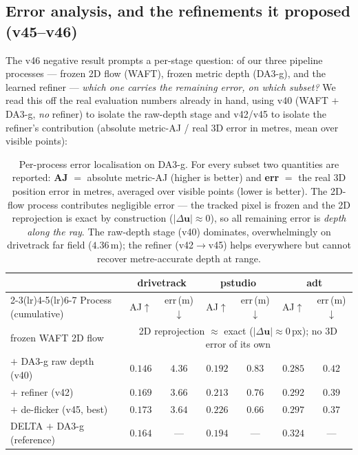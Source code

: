 \documentclass[11pt,a4paper]{article}
\begin{document}
\subsection{Error analysis, and the refinements it proposed (v45--v46)}
\label{sec:error-analysis}
The v46 negative result prompts a per-stage question: of our three pipeline processes --- frozen 2D flow
(WAFT), frozen metric depth (DA3-g), and the learned refiner --- \emph{which one carries the remaining
error, on which subset?} We read this off the real evaluation numbers already in hand, using v40 (WAFT $+$
DA3-g, \emph{no} refiner) to isolate the raw-depth stage and v42/v45 to isolate the refiner's contribution
(absolute metric-AJ / real 3D error in metres, mean over visible points):

\begin{table}[h]
\centering
\small
\caption{Per-process error localisation on DA3-g. For every subset two quantities are reported:
\textbf{AJ} $=$ absolute metric-AJ (higher is better) and \textbf{err} $=$ the real 3D position error in
metres, averaged over visible points (lower is better). The 2D-flow process contributes negligible error ---
the tracked pixel is frozen and the 2D reprojection is exact by construction ($|\Delta\mathbf{u}|\!\approx\!0$),
so all remaining error is \emph{depth along the ray}. The raw-depth stage (v40) dominates, overwhelmingly on
drivetrack far field ($4.36$\,m); the refiner (v42$\to$v45) helps everywhere but cannot recover metre-accurate
depth at range.}
\label{tab:error-stage}
\begin{tabular}{lcccccc}
\toprule
 & \multicolumn{2}{c}{drivetrack} & \multicolumn{2}{c}{pstudio} & \multicolumn{2}{c}{adt} \\
\cmidrule(lr){2-3}\cmidrule(lr){4-5}\cmidrule(lr){6-7}
Process (cumulative) & AJ$\uparrow$ & err\,(m)$\downarrow$ & AJ$\uparrow$ & err\,(m)$\downarrow$ & AJ$\uparrow$ & err\,(m)$\downarrow$ \\
\midrule
frozen WAFT 2D flow            & \multicolumn{6}{c}{2D reprojection $\approx$ exact ($|\Delta\mathbf{u}|\!\approx\!0$\,px); no 3D error of its own} \\
$+$ DA3-g raw depth (v40)      & $0.146$ & $4.36$ & $0.192$ & $0.83$ & $0.285$ & $0.42$ \\
$+$ refiner (v42)              & $0.169$ & $3.66$ & $0.213$ & $0.76$ & $0.292$ & $0.39$ \\
$+$ de-flicker (v45, best)     & $0.173$ & $3.64$ & $0.226$ & $0.66$ & $0.297$ & $0.37$ \\
\midrule
DELTA $+$ DA3-g (reference)    & $0.164$ & --- & $0.194$ & --- & $\mathbf{0.324}$ & --- \\
\bottomrule
\end{tabular}
\end{table}
\end{document}
